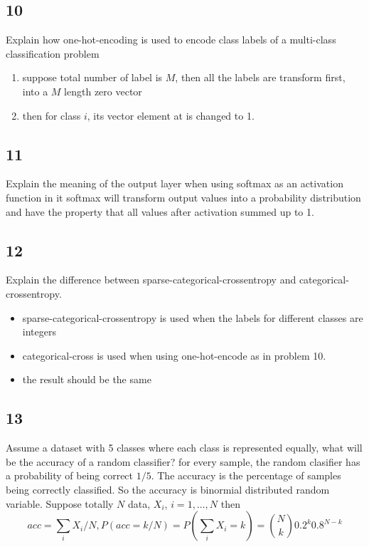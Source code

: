 \documentclass{article}
\begin{document}
\subsection*{10}
\begin{myleftlinebox}
    Explain how one-hot-encoding is used to encode class labels of a multi-class classification problem
    \tcblower
    \begin{enumerate}
        \item suppose total number of label is $M$, then all the labels are transform first, into a $M$ length zero vector
        \item then for class $i$, its vector element at is changed to 1.
    \end{enumerate}    
\end{myleftlinebox}

\subsection*{11}
\begin{myleftlinebox}
    Explain the meaning of the output layer when using softmax as an activation function in it
    \tcblower
    softmax will transform output values into a probability distribution and have the property that all values after activation summed up to 1.
\end{myleftlinebox}

\subsection*{12}
\begin{myleftlinebox}
    Explain the difference between sparse-categorical-crossentropy and categorical-crossentropy.
    \tcblower
    \begin{itemize}
        \item sparse-categorical-crossentropy is used when the labels for different classes are integers
        \item categorical-cross is used when using one-hot-encode as in problem 10.
        \item the result should be the same
    \end{itemize}
\end{myleftlinebox}

\subsection*{13}
\begin{myleftlinebox}
    Assume a dataset with 5 classes where each class is represented equally, what will be the accuracy of a random classifier?
    \tcblower
    for every sample, the random clasifier has a probability of being correct \(1/5\). The accuracy is the percentage of samples being correctly classified. So the accuracy is binormial distributed random variable. Suppose totally \(N\) data, \(X_i\), \(i=1,\dots,N\) then
    \begin{equation*}
        acc = \sum_i X_i/N, P(acc = k/N) = P(\sum_i X_i = k) = \binom{N}{k}0.2^k 0.8^{N-k}
    \end{equation*}
\end{myleftlinebox}
\end{document}
